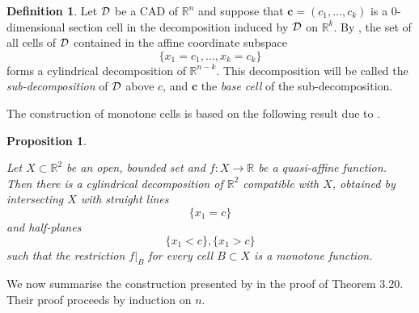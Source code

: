 \documentclass[
]{book}
\newtheorem{proposition}{Proposition}[chapter]
\theoremstyle{definition}
\newtheorem{definition}{Definition}[chapter]
\theoremstyle{definition}
\theoremstyle{definition}
\theoremstyle{definition}
\theoremstyle{remark}
\begin{document}
\begin{definition}
\protect\hypertarget{def:sub-cad}{}\label{def:sub-cad}Let \(\cal D\) be a CAD of \(\mathbb{R}^n\) and suppose that \(\mathbf{c} = (c_1,\ldots,c_k)\) is a \(0\)-dimensional section cell in the decomposition induced by \(\cal D\) on \(\mathbb{R}^k\).
By \citep[ Remark 3.8]{bgv15}, the set of all cells of \(\cal D\) contained in the affine coordinate subspace
\[
\{ x_1=c_1,\dots,x_k=c_k \}
\]
forms a cylindrical decomposition of \(\mathbb{R}^{n-k}\). This decomposition will be called the \emph{sub-decomposition} of \(\cal D\) above \(c\), and \(\mathbf{c}\) the \emph{base cell} of the sub-decomposition.
\end{definition}

The construction of monotone cells is based on the following result due to \citet{bgv15}.

\begin{proposition}
\protect\hypertarget{prp:bgv-monotone}{}\label{prp:bgv-monotone}\citep[Lemma 3.18]{bgv15}

Let \(X \subset \mathbb{R}^2\) be an open, bounded set and \(f : X \to \mathbb{R}\) be a quasi-affine function.
Then there is a cylindrical decomposition of \(\mathbb{R}^2\) compatible with \(X\), obtained by intersecting \(X\) with straight lines \[\{x_1 = c\}\] and half-planes \[\{x_1 < c\},\{x_1 > c\}\] such that the restriction \(f\vert_B\) for every cell \(B \subset X\) is a monotone function.
\end{proposition}

We now summarise the construction presented by \citet{bgv15} in the proof of Theorem 3.20.
Their proof proceeds by induction on \(n\).
\end{document}

